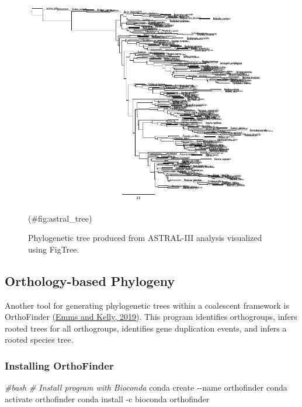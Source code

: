 \documentclass[
  12pt,
]{article}
\newenvironment{Shaded}{\begin{snugshade}}{\end{snugshade}}
\newcommand{\AttributeTok}[1]{\textcolor[rgb]{0.13,0.29,0.53}{#1}}
\newcommand{\CommentTok}[1]{\textcolor[rgb]{0.56,0.35,0.01}{\textit{#1}}}
\newcommand{\ExtensionTok}[1]{#1}
\newcommand{\NormalTok}[1]{#1}
\begin{document}
\begin{figure}
\includegraphics[width=1\linewidth]{Images/astral_tree} \caption{Phylogenetic tree produced from ASTRAL-III analysis visualized using FigTree.}(\#fig:astral_tree)
\end{figure}

\hypertarget{orthology-based-phylogeny}{%
\subsection{Orthology-based Phylogeny}\label{orthology-based-phylogeny}}

Another tool for generating phylogenetic trees within a coalescent framework is OrthoFinder (\protect\hyperlink{ref-Emms2019}{Emms and Kelly, 2019}). This program identifies orthogroups, infers rooted trees for all orthogroups, identifies gene duplication events, and infers a rooted species tree.

\hypertarget{installing-orthofinder}{%
\subsubsection{Installing OrthoFinder}\label{installing-orthofinder}}

\begin{Shaded}
\begin{Highlighting}[]
\CommentTok{\#bash}
\CommentTok{\# Install program with Bioconda}
\ExtensionTok{conda}\NormalTok{ create }\AttributeTok{{-}{-}name}\NormalTok{ orthofinder}
\ExtensionTok{conda}\NormalTok{ activate orthofinder}
\ExtensionTok{conda}\NormalTok{ install }\AttributeTok{{-}c}\NormalTok{ bioconda orthofinder}
\end{Highlighting}
\end{Shaded}
\end{document}

